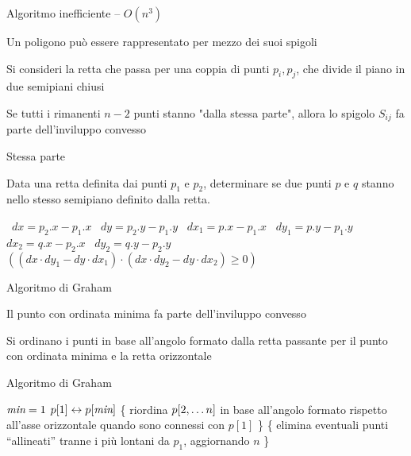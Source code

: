 \begin{frame}{Algoritmo inefficiente -- $O(n^3)$}

\BIL
\item Un poligono può essere rappresentato per mezzo dei suoi spigoli
\item Si consideri la retta che passa per una coppia di punti $p_i,p_j$, che divide il piano in due semipiani chiusi
\item Se tutti i rimanenti $n-2$ punti stanno "dalla stessa parte", allora lo
spigolo $S_{ij}$ fa parte dell’inviluppo convesso
\EIL
{}

\end{frame}



\begin{frame}{Stessa parte}

Data una retta definita dai punti $p_1$ e $p_2$, determinare se due punti $p$ e $q$ 
stanno nello stesso semipiano definito dalla retta.

\medskip
\begin{Procedure}
\caption[A]{\BOOLEAN\ \stessaparte(\Point $p_1$, \Point $p_2$, \Point $p$, \Point $q$)}
\REAL\ $dx = p_2.x - p_1.x$\;
\REAL\ $dy = p_2.y - p_1.y$\;
\REAL\ $dx_1 = p.x - p_1.x$\;
\REAL\ $dy_1 = p.y - p_1.y$\;
\REAL\ $dx_2 = q.x - p_2.x$\;
\REAL\ $dy_2 = q.y - p_2.y$\;
\Return $((dx \cdot dy_1 - dy \cdot dx_1) \cdot (dx \cdot dy_2 - dy \cdot dx_2) \ge 0)$\;
\end{Procedure}

\end{frame}

\begin{frame}{Algoritmo di Graham}

\BIL
\item Il punto con ordinata minima fa parte dell’inviluppo convesso
\item Si ordinano i punti in base all’angolo formato dalla retta passante per il punto con ordinata minima e la retta orizzontale
\EIL


\end{frame}

\begin{frame}{Algoritmo di Graham}

\begin{Procedure}
\caption[A]{\Stack \graham($\Point[\,]\ p$, \INTEGER $n$)}
\INTEGER $\textit{min} = 1$\;
$p[1] \leftrightarrow p[\textit{min}]$\;
\{ riordina $p[2, \ldots n]$ in base all'angolo formato rispetto all'asse orizzontale quando sono connessi con $p[1]$ \}\;
\{ elimina eventuali punti “allineati” tranne i più lontani da $p_1$, aggiornando $n$ \}\;
\end{Procedure}


\end{frame}

